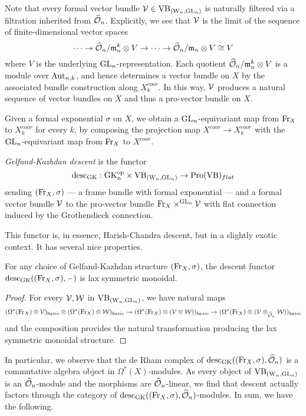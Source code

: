 Note that every formal vector bundle $\mathcal{V} \in {\rm VB}_{({{\rm W}_n}, {\rm GL}_n)}$ is naturally filtered via a filtration inherited from $\widehat{\mathcal O}_n$. 
Explicitly, we see that $\mathcal{V}$ is the limit of the sequence of finite-dimensional vector spaces
\[
\cdots \to \widehat{\mathcal O}_n/{\mathfrak m}_n^k \otimes V \to \cdots \to \widehat{\mathcal O}_n/{\mathfrak m}_n \otimes V \cong V
\]
where $V$ is the underlying ${\rm GL}_n$-representation.
Each quotient $\widehat{\mathcal O}_n/{\mathfrak m}_n^k \otimes V$ is a module over ${\rm Aut}_{n,k}$, and 
hence determines a vector bundle on $X$ by the associated bundle construction along $X^{coor}_k$.
In this way, $\mathcal{V}$ produces a natural sequence of vector bundles on $X$ and thus a pro-vector bundle on $X$.

Given a formal exponential $\sigma$ on $X$, we obtain a ${\rm GL}_n$-equivariant map from ${\rm Fr}_X$ to $X^{coor}_k$ for every $k$,
by composing the projection map $X^{coor} \to X_k^{coor}$ with the ${\rm GL}_n$-equivariant map from ${\rm Fr}_X$ to $X^{coor}$.

\begin{dfn}
{\em Gelfand-Kazhdan descent} is the functor
\[
{\rm desc}_{\rm GK}: {\rm GK}_n^{{\rm op}} \times {\rm VB}_{({{\rm W}_n}, {\rm GL}_n)} \to {\rm Pro}({\rm VB})_{flat}
\]
sending $({\rm Fr}_X,\sigma)$ --- a frame bundle with formal exponential
--- and a formal vector bundle $\mathcal{V}$ 
to the pro-vector bundle ${\rm Fr}_X \times^{{\rm GL}_n} \mathcal{V}$ with flat connection induced by the Grothendieck connection.
\end{dfn}

This functor is, in essence, Harish-Chandra descent, but in a slightly exotic context.
It has several nice properties.

\begin{lemma}\label{prop lax}
For any choice of Gelfand-Kazhdan structure $({\rm Fr}_X,\sigma)$, the descent functor ${\rm desc}_{\rm GK}(({\rm Fr}_X,\sigma),-)$ is lax symmetric monoidal.
\end{lemma}

\begin{proof}
For every $\mathcal{V},\mathcal{W}$ in ${\rm VB}_{({{\rm W}_n}, {\rm GL}_n)}$, we have natural maps
\[
(\Omega^*({\rm Fr}_X) \otimes \mathcal{V})_{basic} \otimes (\Omega^*({\rm Fr}_X) \otimes \mathcal{W})_{basic} \to (\Omega^*({\rm Fr}_X) \otimes (\mathcal{V} \otimes \mathcal{W}))_{basic} \to (\Omega^*({\rm Fr}_X) \otimes (\mathcal{V} \otimes_{\widehat{\mathcal O}_n} \mathcal{W}))_{basic}
\]
and the composition provides the natural transformation producing the lax symmetric monoidal structure.
\end{proof}

In particular, we observe that the de Rham complex of ${\rm desc}_{\rm GK}(({\rm Fr}_X,\sigma),\widehat{\mathcal O}_n)$ is a commutative algebra object in $\Omega^*(X)$-modules. 
As every object of ${\rm VB}_{({{\rm W}_n}, {\rm GL}_n)}$ is an $\widehat{\mathcal O}_n$-module and the morphisms are $\widehat{\mathcal O}_n$-linear, 
we find that descent actually factors through the category of ${\rm desc}_{\rm GK}(({\rm Fr}_X,\sigma),\widehat{\mathcal O}_n)$-modules. 
In sum, we have the following.

